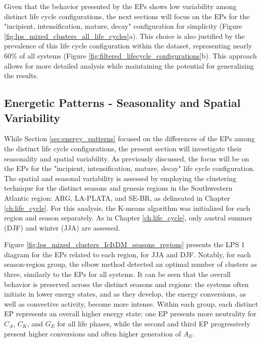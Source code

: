 Given that the behavior presented by the EPs shows low variability among distinct life cycle configurations, the next sections will focus on the EPs for the "incipient, intensification, mature, decay" configuration for simplicity (Figure \ref{fig:lps_mixed_clusters_all_life_cycles}a). This choice is also justified by the prevalence of this life cycle configuration within the dataset, representing nearly 60\% of all systems (Figure \ref{fig:filtered_lifecycle_configurations}b). This approach allows for more detailed analysis while maintaining the potential for generalizing the results.

\subsection{Energetic Patterns - Seasonality and Spatial Variability}\label{sec:energy_patterns_season_region}

While Section \ref{sec:energy_patterns} focused on the differences of the EPs among the distinct life cycle configurations, the present section will investigate their seasonality and spatial variability. As previously discussed, the focus will be on the EPs for the "incipient, intensification, mature, decay" life cycle configuration. The spatial and seasonal variability is assessed by employing the clustering technique for the distinct seasons and genesis regions in the Southwestern Atlantic region: ARG, LA-PLATA, and SE-BR, as delineated in Chapter \ref{ch:life_cycle}. For this analysis, the K-means algorithm was initialized for each region and season separately. As in Chapter \ref{ch:life_cycle}, only austral summer (DJF) and winter (JJA) are assessed.

Figure \ref{fig:lps_mixed_clusters_IcItDM_seasons_regions} presents the LPS 1 diagram for the EPs related to each region, for JJA and DJF. Notably, for each season-region group, the elbow method detected an optimal number of clusters as three, similarly to the EPs for all systems. It can be seen that the overall behavior is preserved across the distinct seasons and regions: the systems often initiate in lower energy states, and as they develop, the energy conversions, as well as convective activity, become more intense. Within each group, each distinct EP represents an overall higher energy state: one EP presents more neutrality for $C_A$, $C_K$, and $G_E$ for all life phases, while the second and third EP progressively present higher conversions and often higher generation of $A_E$.


